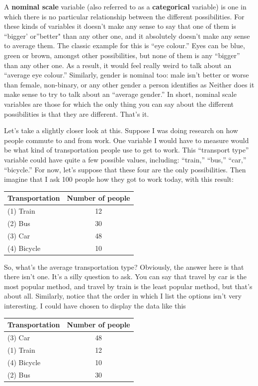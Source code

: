 \documentclass[
]{book}
\begin{document}
A {\textbf{nominal scale}} variable (also referred to as a {\textbf{categorical}} variable) is one in which there is no particular relationship between the different possibilities. For these kinds of variables it doesn't make any sense to say that one of them is ``bigger' or''better" than any other one, and it absolutely doesn't make any sense to average them. The classic example for this is ``eye colour.'' Eyes can be blue, green or brown, amongst other possibilities, but none of them is any ``bigger'' than any other one. As a result, it would feel really weird to talk about an ``average eye colour.'' Similarly, gender is nominal too: male isn't better or worse than female, non-binary, or any other gender a person identifies as Neither does it make sense to try to talk about an ``average gender.'' In short, nominal scale variables are those for which the only thing you can say about the different possibilities is that they are different. That's it.

Let's take a slightly closer look at this. Suppose I was doing research on how people commute to and from work. One variable I would have to measure would be what kind of transportation people use to get to work. This ``transport type'' variable could have quite a few possible values, including: ``train,'' ``bus,'' ``car,'' ``bicycle.'' For now, let's suppose that these four are the only possibilities. Then imagine that I ask 100 people how they got to work today, with this result:

\begin{longtable}[]{@{}lc@{}}
\toprule
Transportation & Number of people\tabularnewline
\midrule
\endhead
(1) Train & 12\tabularnewline
(2) Bus & 30\tabularnewline
(3) Car & 48\tabularnewline
(4) Bicycle & 10\tabularnewline
\bottomrule
\end{longtable}

So, what's the average transportation type? Obviously, the answer here is that there isn't one. It's a silly question to ask. You can say that travel by car is the most popular method, and travel by train is the least popular method, but that's about all. Similarly, notice that the order in which I list the options isn't very interesting. I could have chosen to display the data like this

\begin{longtable}[]{@{}lc@{}}
\toprule
Transportation & Number of people\tabularnewline
\midrule
\endhead
(3) Car & 48\tabularnewline
(1) Train & 12\tabularnewline
(4) Bicycle & 10\tabularnewline
(2) Bus & 30\tabularnewline
\bottomrule
\end{longtable}
\end{document}
